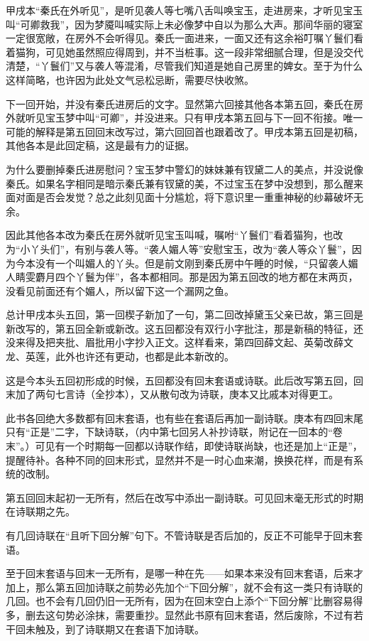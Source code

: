 \par 甲戌本“秦氏在外听见”，是听见袭人等七嘴八舌叫唤宝玉，走进房来，才听见宝玉叫“可卿救我”，因为梦魇叫喊实际上未必像梦中自以为那么大声。那间华丽的寝室一定很宽敞，在房外不会听得见。秦氏一面进来，一面又还有这余裕叮嘱丫鬟们看着猫狗，可见她虽然照应得周到，并不当桩事。这一段非常细腻合理，但是没交代清楚，“丫鬟们”又与袭人等混淆，尽管我们知道是她自己房里的婢女。至于为什么这样简略，也许因为此处文气忌松忌断，需要尽快收煞。
\par 下一回开始，并没有秦氏进房后的文字。显然第六回接其他各本第五回，秦氏在房外就听见宝玉梦中叫“可卿”，并没进来。只有甲戌本第五回与下一回不衔接。唯一可能的解释是第五回回末改写过，第六回回首也跟着改了。甲戌本第五回是初稿，其他各本是此回定稿，这是最有力的证据。
\par 为什么要删掉秦氏进房慰问？宝玉梦中警幻的妹妹兼有钗黛二人的美点，并没说像秦氏。如果名字相同是暗示秦氏兼有钗黛的美，不过宝玉在梦中没想到，那么醒来面对面是否会发觉？总之此刻见面十分尴尬，将下意识里一重重神秘的纱幕破坏无余。
\par 因此其他各本改为秦氏在房外就听见宝玉叫喊，嘱咐“丫鬟们”看着猫狗，也改为“小丫头们”，有别与袭人等。“袭人媚人等”安慰宝玉，改为“袭人等众丫鬟”，因为今本没有一个叫媚人的丫头。但是前文刚到秦氏房中午睡的时候，“只留袭人媚人睛雯麝月四个丫鬟为伴”，各本都相同。那是因为第五回改的地方都在末两页，没看见前面还有个媚人，所以留下这一个漏网之鱼。
\par 总计甲戌本头五回，第一回楔子新加了一句，第二回改掉黛玉父亲已故，第三回是新改写的，第五回全新或新改。这五回都没有双行小字批注，那是新稿的特征，还没来得及把夹批、眉批用小字抄入正文。这样看来，第四回薛文起、英菊改薛文龙、英莲，此外也许还有更动，也都是此本新改的。
\par 这是今本头五回初形成的时候，五回都没有回末套语或诗联。此后改写第五回，回末加了两句七言诗（全抄本），又从散句改为诗联，庚本又比戚本对得更工。
\par 此书各回绝大多数都有回末套语，也有些在套语后再加一副诗联。庚本有四回末尾只有“正是”二字，下缺诗联，（内中第七回另人补抄诗联，附记在一回本的“卷末”。）可见有一个时期每一回都以诗联作结，即使诗联尚缺，也还是加上“正是”，提醒待补。各种不同的回末形式，显然并不是一时心血来潮，换换花样，而是有系统的改制。
\par 第五回回末起初一无所有，然后在改写中添出一副诗联。可见回末毫无形式的时期在诗联期之先。
\par 有几回诗联在“且听下回分解”句下。不管诗联是否后加的，反正不可能早于回末套语。
\par 至于回末套语与回末一无所有，是哪一种在先——如果本来没有回末套语，后来才加上，那么第五回加诗联之前势必先加个“下回分解”，就不会有这一类只有诗联的几回。也不会有几回仍旧一无所有，因为在回末空白上添个“下回分解”比删容易得多，删去这句势必涂抹，需要重抄。显然此书原有回末套语，然后废除，不过有若干回未触及，到了诗联期又在套语下加诗联。
